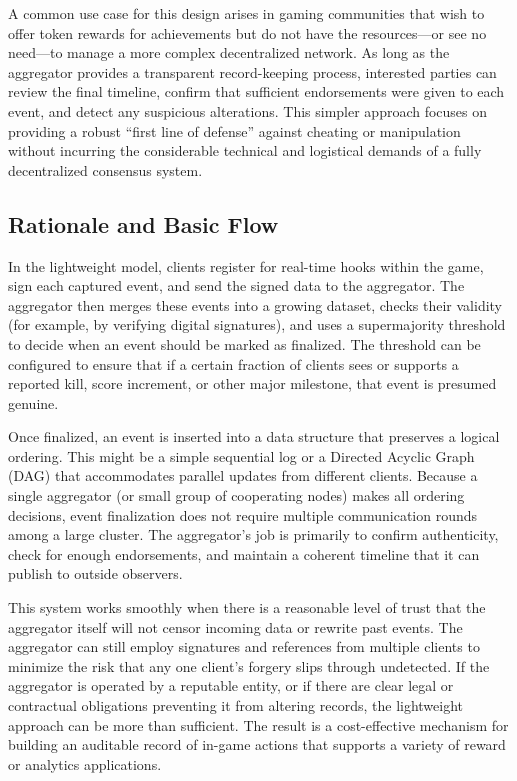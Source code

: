 \documentclass[11pt]{article}
\begin{document}
A common use case for this design arises in gaming communities that wish to offer token rewards for achievements but do not have the resources—or see no need—to manage a more complex decentralized network. As long as the aggregator provides a transparent record-keeping process, interested parties can review the final timeline, confirm that sufficient endorsements were given to each event, and detect any suspicious alterations. This simpler approach focuses on providing a robust “first line of defense” against cheating or manipulation without incurring the considerable technical and logistical demands of a fully decentralized consensus system.

\subsection{Rationale and Basic Flow}
In the lightweight model, clients register for real-time hooks within the game, sign each captured event, and send the signed data to the aggregator. The aggregator then merges these events into a growing dataset, checks their validity (for example, by verifying digital signatures), and uses a supermajority threshold to decide when an event should be marked as finalized. The threshold can be configured to ensure that if a certain fraction of clients sees or supports a reported kill, score increment, or other major milestone, that event is presumed genuine.

Once finalized, an event is inserted into a data structure that preserves a logical ordering. This might be a simple sequential log or a Directed Acyclic Graph (DAG) that accommodates parallel updates from different clients. Because a single aggregator (or small group of cooperating nodes) makes all ordering decisions, event finalization does not require multiple communication rounds among a large cluster. The aggregator’s job is primarily to confirm authenticity, check for enough endorsements, and maintain a coherent timeline that it can publish to outside observers.

This system works smoothly when there is a reasonable level of trust that the aggregator itself will not censor incoming data or rewrite past events. The aggregator can still employ signatures and references from multiple clients to minimize the risk that any one client’s forgery slips through undetected. If the aggregator is operated by a reputable entity, or if there are clear legal or contractual obligations preventing it from altering records, the lightweight approach can be more than sufficient. The result is a cost-effective mechanism for building an auditable record of in-game actions that supports a variety of reward or analytics applications.
\end{document}
